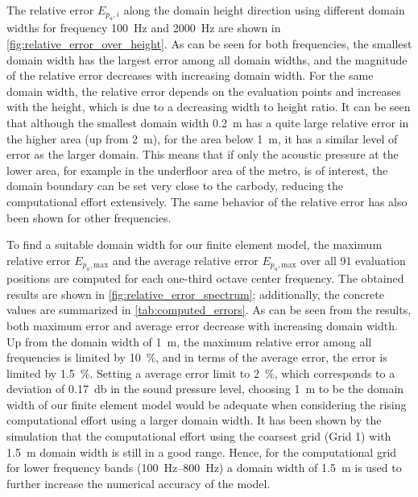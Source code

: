 {The relative error $E_{p_a,i}$ along the domain height direction using different domain widths for frequency \SI{100}{\hertz} and \SI{2000}{\hertz} are shown in \cref{fig:relative_error_over_height}. As can be seen for both frequencies, the smallest domain width has the largest error among all domain widths, and the magnitude of the relative error decreases with increasing domain width. For the same domain width, the relative error depends on the evaluation points and increases with the height, which is due to a decreasing width to height ratio. It can be seen that although the smallest domain width \SI{0.2}{\meter} has a quite large relative error in the higher area (up from \SI{2}{\meter}), for the area below \SI{1}{\meter}, it has a similar level of error as the larger domain. This means that if only the acoustic pressure at the lower area, for example in the underfloor area of the metro, is of interest, the domain boundary can be set very close to the carbody, reducing the computational effort extensively. The same behavior of the relative error has also been shown for other frequencies.

To find a suitable domain width for our finite element model, the maximum relative error $E_{p_a,\text{max}}$ and the average relative error $E_{p_a,\text{max}}$ over all 91 evaluation positions are computed for each one-third octave center frequency. The obtained results are shown in \cref{fig:relative_error_spectrum}; additionally, the concrete values are summarized in \cref{tab:computed_errors}. As can be seen from the results, both maximum error and average error decrease with increasing domain width. Up from the domain width of \SI{1}{\meter}, the maximum relative error among all frequencies is limited by \SI{10}{\percent}, and in terms of the average error, the error is limited by \SI{1.5}{\percent}. Setting a average error limit to \SI{2}{\percent}, which corresponds to a deviation of \SI{0.17}{\decibel} in the sound pressure level, choosing \SI{1}{\meter} to be the domain width of our finite element model would be adequate when considering the rising computational effort using a larger domain width. It has been shown by the simulation that the computational effort using the coarsest grid (Grid 1) with \SI{1.5}{\meter} domain width is still in a good range. Hence, for the computational grid for lower frequency bands (\SIrange{100}{800}{\hertz}) a domain width of \SI{1.5}{\meter} is used to further increase the numerical accuracy of the model.

}
